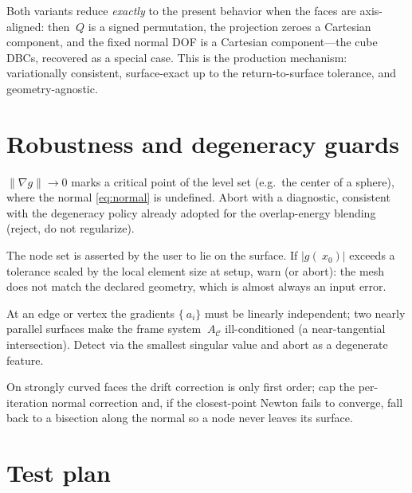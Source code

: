 \documentclass[11pt]{article}
\newcommand{\grad}{\nabla}
\newcommand{\norm}[1]{\lVert #1 \rVert}
\begin{document}
Both variants reduce \emph{exactly} to the present behavior when the faces are
axis-aligned: then $~Q$ is a signed permutation, the projection zeroes a
Cartesian component, and the fixed normal DOF is a Cartesian component---the
cube DBCs, recovered as a special case. This is the production mechanism:
variationally consistent, surface-exact up to the return-to-surface tolerance,
and geometry-agnostic.

\section{Robustness and degeneracy guards}
\label{sec:robustness}

\begin{description}[style=unboxed,leftmargin=0pt,itemsep=2pt]
  \item[Vanishing gradient.] $\norm{\grad g}\to0$ marks a critical point of the
  level set (e.g.\ the center of a sphere), where the normal
  \eqref{eq:normal} is undefined. Abort with a diagnostic, consistent with the
  degeneracy policy already adopted for the overlap-energy blending (reject, do
  not regularize).
  \item[Node off the declared surface.] The node set is asserted by the user to
  lie on the surface. If $|g(~x_0)|$ exceeds a tolerance scaled by the local
  element size at setup, warn (or abort): the mesh does not match the declared
  geometry, which is almost always an input error.
  \item[Rank-deficient feature.] At an edge or vertex the gradients
  $\{~a_i\}$ must be linearly independent; two nearly parallel surfaces make the
  frame system $~A_{\mathcal C}$ ill-conditioned (a near-tangential
  intersection). Detect via the smallest singular value and abort as a
  degenerate feature.
  \item[Return-to-surface convergence.] On strongly curved faces the drift
  correction is only first order; cap the per-iteration normal correction and,
  if the closest-point Newton fails to converge, fall back to a bisection along
  the normal so a node never leaves its surface.
\end{description}

\section{Test plan}
\label{sec:tests}
\end{document}

